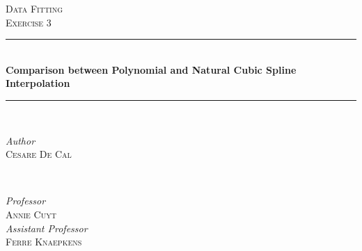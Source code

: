 \documentclass{article}
\begin{document}

\begin{titlepage} %
	\newcommand{\HRule}{\rule{\linewidth}{0.5mm}}%
	
	\center %
	
	
	\textsc{\Large Data Fitting}\\[0.5cm] %
	
	\textsc{\large Exercise 3}\\[0.5cm] %
	
	
	\HRule\\[0.6cm]
	
	{\huge\bfseries Comparison between Polynomial and Natural Cubic Spline Interpolation}\\[0.25cm] %
	
	\HRule\\[1.5cm]
	
	
	\begin{minipage}{0.4\textwidth}
		\begin{flushleft}
			\large
			\textit{Author}\\
			\textsc{Cesare De Cal} %
		\end{flushleft}
	\end{minipage}
	~
	\begin{minipage}{0.4\textwidth}
		\begin{flushright}
			\large
			\textit{Professor}\\
			\textsc{Annie Cuyt}\\ %
			[0.25cm]
			\textit{Assistant Professor}\\
			\textsc{Ferre Knaepkens} %


\end{flushright}
\end{minipage}
\end{titlepage}
\end{document}
